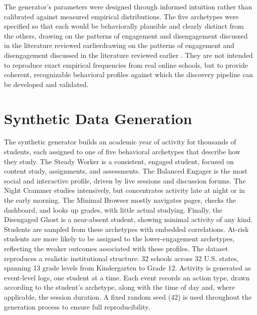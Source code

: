 The generator's parameters were designed through informed intuition rather than calibrated against measured empirical distributions. The five archetypes were specified so that each would be behaviorally plausible and clearly distinct from the others, drawing on the patterns of engagement and disengagement discussed in the literature reviewed earlierdrawing on the patterns of engagement and disengagement discussed in the literature reviewed earlier \cite{fostering_curtis_2015, beck_atrisk_2024}. They are not intended to reproduce exact empirical frequencies from real online schools, but to provide coherent, recognizable behavioral profiles against which the discovery pipeline can be developed and validated.

\section{Synthetic Data Generation}
\label{sec:synthetic-data-generation}
The synthetic generator builds an academic year of activity for thousands of students, each assigned to one of five behavioral archetypes that describe how they study. The Steady Worker is a consistent, engaged student, focused on content study, assignments, and assessments. The Balanced Engager is the most social and interactive profile, driven by live sessions and discussion forums. The Night Crammer studies intensively, but concentrates activity late at night or in the early morning. The Minimal Browser mostly navigates pages, checks the dashboard, and looks up grades, with little actual studying. Finally, the Disengaged Ghost is a near-absent student, showing minimal activity of any kind.
Students are sampled from these archetypes with embedded correlations. At-risk students are more likely to be assigned to the lower-engagement archetypes, reflecting the weaker outcomes associated with these profiles. The dataset reproduces a realistic institutional structure: 32 schools across 32 U.S. states, spanning 13 grade levels from Kindergarten to Grade 12.
Activity is generated as event-level logs, one student at a time. Each event records an action type, drawn according to the student's archetype, along with the time of day and, where applicable, the session duration. A fixed random seed (42) is used throughout the generation process to ensure full reproducibility.


